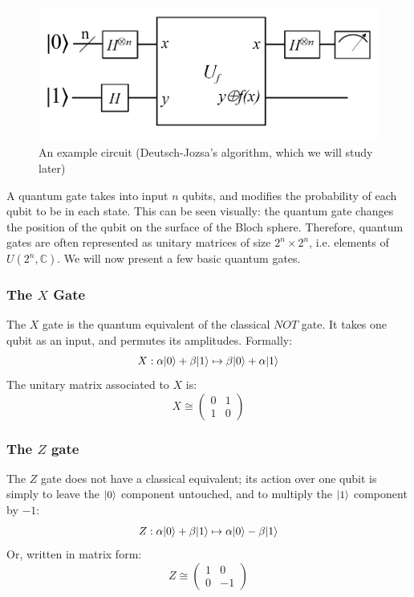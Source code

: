 \documentclass[12pt,a4paper]{article}
\theoremstyle{plain}
\theoremstyle{definition}
\DeclarePairedDelimiter\ket{\lvert}{\rangle}
\begin{document}
\begin{figure}[!ht]
    \centering
    \includegraphics*[scale=0.35]{deutsch-circuit-n.png}
    \caption{An example circuit (Deutsch-Jozsa's algorithm, which we will study later)}
\end{figure}

A quantum gate takes into input $n$ qubits, and modifies the probability of each qubit to be in each state. This can be seen visually: the quantum gate changes the position of the qubit on the surface of the Bloch sphere. Therefore, quantum gates are often represented as unitary matrices of size $2^n \times 2^n$, i.e. elements of $U(2^n, \mathbb{C})$. We will now present a few basic quantum gates.

\subsubsection{The \texorpdfstring{$X$}{ X} Gate}
The $X$ gate is the quantum equivalent of the classical $NOT$ gate. It takes one qubit as an input, and permutes its amplitudes. Formally:
\begin{equation*}
    X : \alpha\ket{0} + \beta\ket{1} \mapsto \beta\ket{0} + \alpha\ket{1}
\end{equation*}
The unitary matrix associated to $X$ is:
\begin{equation*}
    X \cong \begin{pmatrix}
        0&1\\
        1&0
    \end{pmatrix}
\end{equation*}

\subsubsection{The \texorpdfstring{$Z$}{ Z} gate}
The $Z$ gate does not have a classical equivalent; its action over one qubit is simply to leave the $\ket{0}$ component untouched, and to multiply the $\ket{1}$ component by $-1$:
\begin{equation*}
    Z : \alpha\ket{0} + \beta\ket{1} \mapsto \alpha\ket{0} - \beta\ket{1}
\end{equation*}
Or, written in matrix form:
\begin{equation*}
    Z \cong \begin{pmatrix}
        1&0\\
        0&-1
    \end{pmatrix}
\end{equation*}
\end{document}
